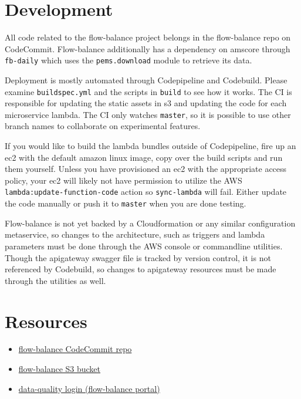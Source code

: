 \documentclass[titlepage]{article}
\begin{document}
\section{Development}\label{development}
All code related to the flow-balance project belongs in the flow-balance repo on CodeCommit. Flow-balance additionally has a dependency on amscore through \texttt{fb-daily} which uses the \texttt{pems.download} module to retrieve its data.

Deployment is mostly automated through Codepipeline and Codebuild. Please examine \texttt{buildspec.yml} and the scripts in \texttt{build} to see how it works. The CI is responsible for updating the static assets in s3 and updating the code for each microservice lambda. The CI only watches \texttt{master}, so it is possible to use other branch names to collaborate on experimental features.

If you would like to build the lambda bundles outside of Codepipeline, fire up an ec2 with the default amazon linux image, copy over the build scripts and run them yourself. Unless you have provisioned an ec2 with the appropriate access policy, your ec2 will likely not have permission to utilize the AWS \texttt{lambda:update-function-code} action so \texttt{sync-lambda} will fail. Either update the code manually or push it to \texttt{master} when you are done testing.

Flow-balance is not yet backed by a Cloudformation or any similar configuration metaservice, so changes to the architecture, such as triggers and lambda parameters must be done through the AWS console or commandline utilities. Though the apigateway swagger file is tracked by version control, it is not referenced by Codebuild, so changes to apigateway resources must be made through the utilities as well.

\section{Resources}\label{resources}
\begin{itemize}
	\item \href{https://us-west-2.console.aws.amazon.com/codesuite/codecommit/repositories/flow-balance/browse}{flow-balance CodeCommit repo}
	\item \href{https://console.aws.amazon.com/s3/buckets/flow-balance/?region=us-west-2}{flow-balance S3 bucket}
	\item \href{https://connected-corridors.berkeley.edu/tool}{data-quality login (flow-balance portal)}
\end{itemize}
\end{document}
